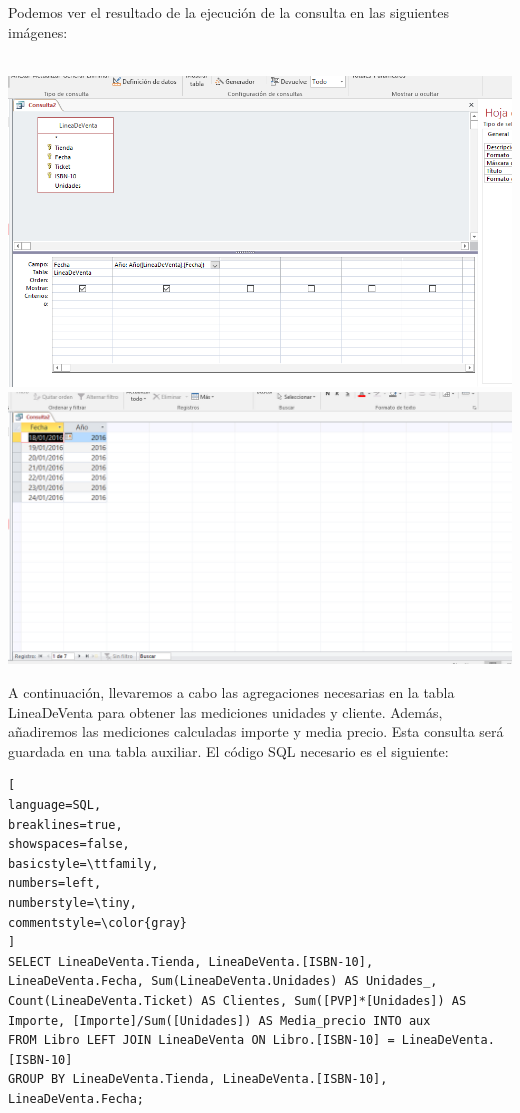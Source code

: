 \documentclass[paper=a4, fontsize=11pt, spanish]{scrartcl}
\numberwithin{equation}{section} %
\numberwithin{figure}{section} %
\numberwithin{table}{section} %
\begin{document}
Podemos ver el resultado de la ejecución de la consulta en las siguientes imágenes:\\
\\
\begin{center}
	\includegraphics[scale=0.35]{fecha1.png}
	\includegraphics[scale=0.35]{fecha2.png}
\end{center}
\bigskip
A continuación,  llevaremos a cabo las agregaciones necesarias en la tabla LineaDeVenta para obtener las mediciones unidades y cliente. Además, añadiremos las mediciones calculadas importe y media precio. Esta consulta será guardada en una tabla auxiliar. 
\newline El código SQL necesario es el siguiente:
\begin{lstlisting}[
language=SQL,
breaklines=true,
showspaces=false,
basicstyle=\ttfamily,
numbers=left,
numberstyle=\tiny,
commentstyle=\color{gray}
]
SELECT LineaDeVenta.Tienda, LineaDeVenta.[ISBN-10], LineaDeVenta.Fecha, Sum(LineaDeVenta.Unidades) AS Unidades_, Count(LineaDeVenta.Ticket) AS Clientes, Sum([PVP]*[Unidades]) AS Importe, [Importe]/Sum([Unidades]) AS Media_precio INTO aux
FROM Libro LEFT JOIN LineaDeVenta ON Libro.[ISBN-10] = LineaDeVenta.[ISBN-10]
GROUP BY LineaDeVenta.Tienda, LineaDeVenta.[ISBN-10], LineaDeVenta.Fecha;
\end{lstlisting}
\end{document}
